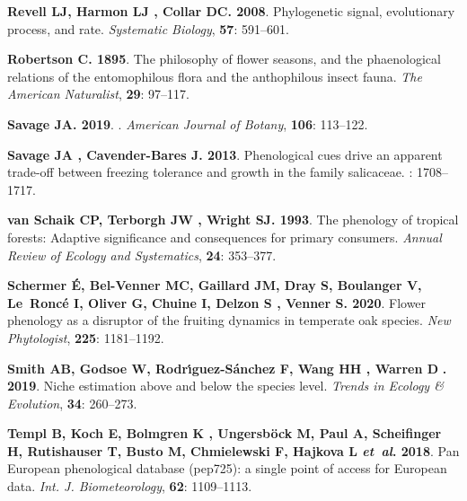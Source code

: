 \documentclass[11pt]{article}
\begin{document}
\begin{thebibliography}{48}
{\bf Revell LJ, Harmon LJ , Collar DC}{\bf . 2008}.
\newblock Phylogenetic signal, evolutionary process, and rate.
\newblock \emph{Systematic Biology}, {\bf 57}: 591--601.

{\bf Robertson C}{\bf . 1895}.
\newblock The philosophy of flower seasons, and the phaenological relations of
  the entomophilous flora and the anthophilous insect fauna.
\newblock \emph{The American Naturalist}, {\bf 29}: 97--117.

{\bf Savage JA}{\bf . {2019}}.
.
\newblock \emph{{American Journal of Botany}}, {\bf {106}}: {113--122}.

{\bf Savage JA , Cavender-Bares J}{\bf . 2013}.
\newblock Phenological cues drive an apparent trade-off between freezing
  tolerance and growth in the family salicaceae.
: 1708--1717.

{\bf van Schaik CP, Terborgh JW , Wright SJ}{\bf . 1993}.
\newblock The phenology of tropical forests: Adaptive significance and
  consequences for primary consumers.
\newblock \emph{Annual Review of Ecology and Systematics}, {\bf 24}: 353--377.

{\bf Schermer {\'E}, Bel-Venner MC, Gaillard JM, Dray S, Boulanger V,
  Le~Ronc{\'e} I, Oliver G, Chuine I, Delzon S , Venner S}{\bf . 2020}.
\newblock Flower phenology as a disruptor of the fruiting dynamics in temperate
  oak species.
\newblock \emph{New Phytologist}, {\bf 225}: 1181--1192.

{\bf Smith AB, Godsoe W, Rodr{\'\i}guez-S{\'a}nchez F, Wang HH , Warren D}{\bf
  . 2019}.
\newblock Niche estimation above and below the species level.
\newblock \emph{Trends in Ecology \& Evolution}, {\bf 34}: 260--273.

{\bf Templ B, Koch E, Bolmgren K
	, Ungersb{\"o}ck M, Paul A, Scheifinger H,
  Rutishauser T, Busto M, Chmielewski F, Hajkova L \emph{et~al}}{\bf . 2018}.
\newblock Pan European phenological database (pep725): a single point of access
  for European data.
\newblock \emph{Int. J. Biometeorology}, {\bf 62}: 1109--1113.


\end{thebibliography}
\end{document}
